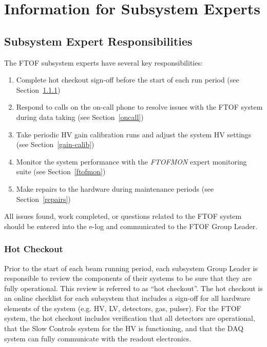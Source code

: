 \documentclass[12pt]{article}
\begin{document}
\clearpage

\vfil
\eject

\section{Information for Subsystem Experts}

\subsection{Subsystem Expert Responsibilities}

The FTOF subsystem experts have several key responsibilities:

\begin{enumerate}
\item Complete hot checkout sign-off before the start of each run period (see 
Section~\ref{checkout})
\item Respond to calls on the on-call phone to resolve issues with the FTOF system 
during data taking (see Section~\ref{oncall})
\item Take periodic HV gain calibration runs and adjust the system HV settings (see 
Section~\ref{gain-calib})
\item Monitor the system performance with the {\it FTOFMON} expert monitoring suite
(see Section~\ref{ftofmon})
\item Make repairs to the hardware during maintenance periods (see Section~\ref{repairs})
\end{enumerate}

All issues found, work completed, or questions related to the FTOF system should be 
entered into the e-log and communicated to the FTOF Group Leader.

\subsubsection{Hot Checkout}
\label{checkout}

Prior to the start of each beam running period, each subsystem Group Leader is 
responsible to review the components of their systems to be sure that they are fully 
operational. This review is referred to as ``hot checkout''. The hot checkout is an 
online checklist for each subsystem that includes a sign-off for all hardware elements 
of the system (e.g. HV, LV, detectors, gas, pulser). For the FTOF system, the hot 
checkout includes verification that all detectors are operational, that the Slow 
Controls system for the HV is functioning, and that the DAQ system can fully communicate 
with the readout electronics. 
\end{document}
